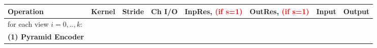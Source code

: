 \begin{table}[htbp]
\scriptsize
\centering
\begin{adjustbox}{width=1\textwidth}
\def\arraystretch{1.75}
\begin{tabular}{|l|c|c|c|c|c|c|c|}
\hline
\rowcolor{bgcolor}
\textbf{Operation}                     & \textbf{Kernel} & \textbf{Stride} & \textbf{Ch I/O} & \textbf{InpRes}, \textcolor{red}{(if s=1)} & \textbf{OutRes}, \textcolor{red}{(if s=1)} & \textbf{Input}     & \textbf{Output} \\ \hline
\hline
for each view $i = 0, .., k:$            &                 &                 &                 &                 &                 &                    &                 \\ \hline
\rowcolor{bgcolor}
\textbf{(1) Pyramid Encoder}           &                 &                 &                 &                 &                 &                    &                 \\ \hline


\end{tabular}
\end{adjustbox}
\end{table}
